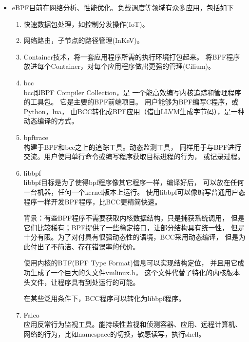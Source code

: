 \documentclass[AutoFakeBold,a4paper]{ctexart}
\begin{document}
\begin{itemize}
    \item eBPF目前在网络分析、性能优化、负载调度等领域有众多应用，包括如下
    \begin{enumerate}
        \item 快速数据包处理，如控制分发操作(IoT)。
        \item 网络路由，子节点的路径管理(InKeV)。
        \item Container技术，将一套应用程序所需的执行环境打包起来。
        将BPF程序放进每个Container，对每个应用程序做出更强的管理(Cilium)。
        \item bcc\cite{bcc2021}\\
        bcc即BPF Compiler Collection，是
        一个能高效编写内核追踪和管理程序的工具包。
        它是主要的BPF前端项目。
        用户能够为BPF编写C程序，或Python，lua，
        由BCC转化成BPF应用（借由LLVM生成字节码），是一种动态编译的方式。
        \item bpftrace\cite{bpftrace2021}\\
        构建于BPF和bcc之上的追踪工具。动态监测工具，
        同样用于与BPF进行交流。用户使用单行命令或编写程序获取目标进程的行为，
        或记录过程。
        \item libbpf\cite{BPFPort2020}\\
        libbpf目标是为了使得bpf程序像其它程序一样，编译好后，
        可以放在任何一台机器，任何一个kernel版本上运行。
        使用libbpf可以像编写普通用户态程序一样开发BPF程序，比BCC更精简快速。

        背景：有些BPF程序不需要获取内核数据结构，只是捕获系统调用，
        但是它们比较稀有；BPF提供了一些稳定接口，让部分结构具有统一性，
        但是十分有限。为了对付具有很强动态性的语境，BCC采用动态编译，
        但是为此付出了不简洁、存在错误率的代价。

        使用内核的BTF(BPF Type Format)信息可以实现结构定位，
        并且用它成功生成了一个巨大的头文件vmlinux.h，
        这个文件代替了特化的内核版本头文件，让程序具有到处运行的可能。

        在某些泛用条件下，BCC程序可以转化为libbpf程序。
        \item Falco\cite{Falco2021}\\
        应用反常行为监视工具。能持续性监视和侦测容器、应用、远程计算机、
        网络的行为，比如namespace的切换，敏感读写，执行shell。


\end{enumerate}
\end{itemize}
\end{document}
